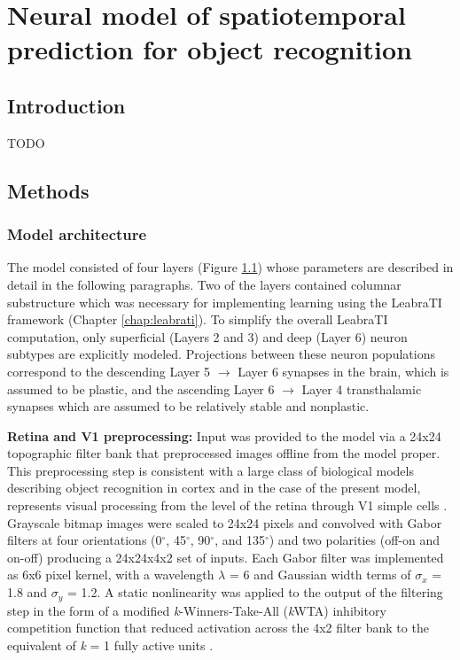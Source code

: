 \documentclass[dwyatte_dissertation.tex]{subfiles}
\begin{document}
\chapter{Neural model of spatiotemporal prediction for object recognition}

\section{Introduction}
TODO

\section{Methods}

\subsection{Model architecture}

The model consisted of four layers (Figure \ref{fig:v1_v2}) whose parameters are described in detail in the following paragraphs. Two of the layers contained columnar substructure which was necessary for implementing learning using the LeabraTI framework (Chapter \ref{chap:leabrati}). To simplify the overall LeabraTI computation, only superficial (Layers 2 and 3) and deep (Layer 6) neuron subtypes are explicitly modeled. Projections between these neuron populations correspond to the descending Layer 5 $\rightarrow$ Layer 6 synapses in the brain, which is assumed to be plastic, and the ascending Layer 6 $\rightarrow$ Layer 4 transthalamic synapses which are assumed to be relatively stable and nonplastic.

\begin{figure}[h!]
\begin{center}
\end{center}
\caption{}{}
\label{fig:v1_v2}
\end{figure}

\textbf{Retina and V1 preprocessing:} Input was provided to the model via a 24x24 topographic filter bank that preprocessed images offline from the model proper. This preprocessing step is consistent with a large class of biological models describing object recognition in cortex \cite[e.g.,]{RiesenhuberPoggio99,SerreOlivaPoggio07,OReillyWyatteHerdEtAl13} and in the case of the present model, represents visual processing from the level of the retina through V1 simple cells \cite{HubelWiesel62}. Grayscale bitmap images were scaled to 24x24 pixels and convolved with Gabor filters at four orientations (0$^\circ$, 45$^\circ$, 90$^\circ$, and 135$^\circ$) and two polarities (off-on and on-off) producing a 24x24x4x2 set of inputs. Each Gabor filter was implemented as 6x6 pixel kernel, with a wavelength $\lambda$ = 6 and Gaussian width terms of $\sigma_x$ = 1.8 and $\sigma_y$ = 1.2. A static nonlinearity was applied to the output of the filtering step in the form of a modified \textit{k}-Winners-Take-All (\textit{k}WTA) inhibitory competition function that reduced activation across the 4x2 filter bank to the equivalent of \textit{k} = 1 fully active units \cite[see][Supporting Information]{OReillyWyatteHerdEtAl13}.
\end{document}
